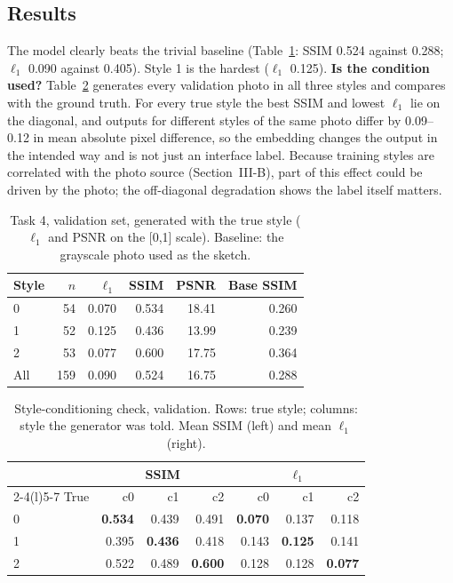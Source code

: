 \documentclass[conference]{IEEEtran}
\begin{document}
\subsection{Results}
The model clearly beats the trivial baseline (Table~\ref{tab:t4}: SSIM 0.524 against 0.288; $\ell_1$ 0.090 against 0.405). Style 1 is the hardest ($\ell_1$ 0.125). \textbf{Is the condition used?} Table~\ref{tab:swap} generates every validation photo in all three styles and compares with the ground truth. For every true style the best SSIM and lowest $\ell_1$ lie on the diagonal, and outputs for different styles of the same photo differ by 0.09--0.12 in mean absolute pixel difference, so the embedding changes the output in the intended way and is not just an interface label. Because training styles are correlated with the photo source (Section~III-B), part of this effect could be driven by the photo; the off-diagonal degradation shows the label itself matters.

\begin{table}[t]
\caption{Task 4, validation set, generated with the true style ($\ell_1$ and PSNR on the [0,1] scale). Baseline: the grayscale photo used as the sketch.}
\label{tab:t4}
\centering\footnotesize
\begin{tabular}{@{}lrrrrr@{}}
\toprule
Style & $n$ & $\ell_1$ & SSIM & PSNR & Base SSIM\\
\midrule
0 & 54 & 0.070 & 0.534 & 18.41 & 0.260\\
1 & 52 & 0.125 & 0.436 & 13.99 & 0.239\\
2 & 53 & 0.077 & 0.600 & 17.75 & 0.364\\
All & 159 & 0.090 & 0.524 & 16.75 & 0.288\\
\bottomrule
\end{tabular}
\end{table}

\begin{table}[t]
\caption{Style-conditioning check, validation. Rows: true style; columns: style the generator was told. Mean SSIM (left) and mean $\ell_1$ (right).}
\label{tab:swap}
\centering\footnotesize
\begin{tabular}{@{}lrrrrrr@{}}
\toprule
 & \multicolumn{3}{c}{SSIM} & \multicolumn{3}{c}{$\ell_1$}\\
\cmidrule(lr){2-4}\cmidrule(l){5-7}
True & c0 & c1 & c2 & c0 & c1 & c2\\
\midrule
0 & \textbf{0.534} & 0.439 & 0.491 & \textbf{0.070} & 0.137 & 0.118\\
1 & 0.395 & \textbf{0.436} & 0.418 & 0.143 & \textbf{0.125} & 0.141\\
2 & 0.522 & 0.489 & \textbf{0.600} & 0.128 & 0.128 & \textbf{0.077}\\
\bottomrule
\end{tabular}
\end{table}
\end{document}
